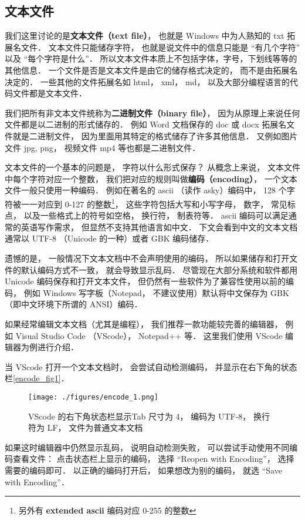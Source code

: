 
\subsection{文本文件}
我们这里讨论的是\textbf{文本文件（text file）}， 也就是 Windows 中为人熟知的 txt 拓展名文件． 文本文件只能储存字符， 也就是说文件中的信息只能是 “有几个字符” 以及 “每个字符是什么”． 所以文本文件本质上不包括字体，字号，下划线等等的其他信息． 一个文件是否是文本文件是由它的储存格式决定的， 而不是由拓展名决定的． 一些其他的文件拓展名如 html， xml， md， 以及大部分编程语言的代码文件都是文本文件．

我们把所有非文本文件统称为\textbf{二进制文件（binary file）}， 因为从原理上来说任何文件都是以二进制的形式储存的． 例如 Word 文档保存的 doc 或 docx 拓展名文件就是二进制文件， 因为里面用其特定的格式储存了许多其他信息．  又例如图片文件 jpg, png， 视频文件 mp4 等也都是二进制文件．

文本文件的一个基本的问题是， 字符以什么形式保存？ 从概念上来说， 文本文件中每个字符对应一个整数， 我们把对应的规则叫做\textbf{编码（encoding）}， 一个文本文件一般只使用一种编码． 例如在著名的 ascii （读作 asky）编码中， 128 个字符被一一对应到 0-127 的整数\footnote{另外有 \textbf{extended ascii} 编码对应 0-255 的整数}， 这些字符包括大写和小写字母， 数字， 常见标点， 以及一些格式上的符号如空格， 换行符， 制表符等． ascii 编码可以满足通常的英语写作需求， 但显然不支持其他语言如中文． 下文会看到中文的文本文档通常以 UTF-8 （Unicode 的一种）或者 GBK 编码储存．

遗憾的是， 一般情况下文本文档中不会声明使用的编码， 所以如果储存和打开文件的默认编码方式不一致， 就会导致显示乱码． 尽管现在大部分系统和软件都用 Unicode 编码保存和打开文本文件， 但仍然有一些软件为了兼容性使用以前的编码， 例如 Windows 写字板（Notepad， 不建议使用）默认将中文保存为 GBK（即中文环境下所谓的 ANSI）编码．

如果经常编辑文本文档（尤其是编程）， 我们推荐一款功能较完善的编辑器， 例如 Visual Studio Code （VScode）， Notepad++ 等． 这里我们使用 VScode 编辑器为例进行介绍．

当 VScode 打开一个文本文档时， 会尝试自动检测编码， 并显示在右下角的状态栏\autoref{encode_fig1}．
\begin{figure}[ht]
\centering
\texttt{[image: ./figures/encode\_1.png]}
\caption{VScode 的右下角状态栏显示Tab 尺寸为 4， 编码为 UTF-8， 换行符为 LF， 文件为普通文本文档} \label{encode_fig1}
\end{figure}
如果这时编辑器中仍然显示乱码， 说明自动检测失败， 可以尝试手动使用不同编码查看文件： 点击状态栏上显示的编码， 选择 “Reopen with Encoding”， 选择需要的编码即可． 以正确的编码打开后， 如果想改为别的编码， 就选 “Save with Encoding”．

